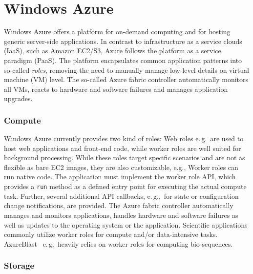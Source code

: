 \documentclass[conference,final]{IEEEtran}
\newcommand{\up}{\vspace*{-1em}}
\newcommand{\alnote}[1]{ {\textcolor{blue} { ***AL: #1 }}}
\newcommand{\jhanote}[1]{ {\textcolor{red} { ***SJ: #1 }}}
\newcommand{\alnote}[1]{}
\newcommand{\jhanote}[1]{}
\begin{document}
\section{Windows Azure}
\label{sec:azure}
\up
Windows Azure offers a platform for on-demand computing and for
hosting generic server-side applications.  In contrast to
infrastructure as a service clouds (IaaS), such as Amazon EC2/S3,
Azure follows the platform as a service paradigm (PaaS).  The platform
encapsulates common application patterns into so-called {\it roles},
removing the need to manually manage low-level details on virtual
machine (VM) level.  The so-called Azure fabric controller
automatically monitors all VMs, reacts to hardware and software
failures and manages application upgrades.

\subsubsection{Compute}

Windows Azure currently provides two kind of 
roles: Web roles e.\,g.\ are used to host web applications and
front-end code, while worker roles are well suited for background
processing. While these roles target specific scenarios and are not as
flexible as bare EC2 images, they are also customizable, %
e.g., Worker roles can run native code. The application must implement
the worker role API, which provides a \texttt{run} method as a defined
entry point for executing the actual compute task. Further, several
additional API callbacks, e.\,g.,\ for state or configuration change
notifications, are provided.%
The Azure fabric controller automatically manages and monitors
applications, handles hardware and software failures as well as
updates to the operating system or the application.  Scientific
applications commonly utilize worker roles for compute and/or
data-intensive tasks. AzureBlast~\cite{azure_blast} e.\,g.\ heavily
relies on worker roles for computing bio-sequences.

\subsubsection{Storage}
\end{document}
